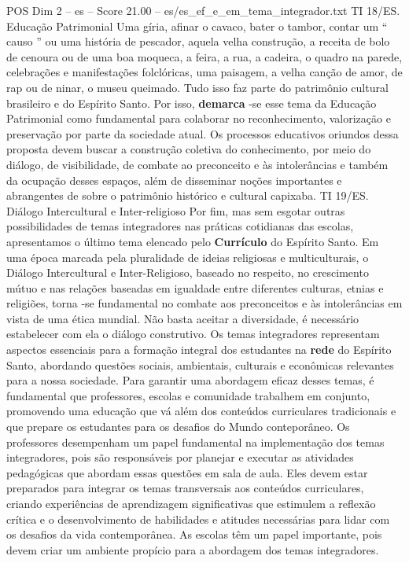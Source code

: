 \begin{textsample}{POS Dim 2 – es – Score 21.00 – es/es\_ef\_e\_em\_tema\_integrador.txt}
TI 18/ES.
Educação Patrimonial Uma gíria, afinar o cavaco, bater o tambor, contar um “ causo ” ou uma história de pescador, aquela velha construção, a receita de bolo de cenoura ou de uma boa moqueca, a feira, a rua, a cadeira, o quadro na parede, celebrações e manifestações folclóricas, uma paisagem, a velha canção de amor, de rap ou de ninar, o museu queimado.
Tudo isso faz parte do patrimônio cultural brasileiro e do Espírito Santo.
Por isso, \textbf{demarca} -se esse tema da Educação Patrimonial como fundamental para colaborar no reconhecimento, valorização e preservação por parte da sociedade atual.
Os processos educativos oriundos dessa proposta devem buscar a construção coletiva do conhecimento, por meio do diálogo, de visibilidade, de combate ao preconceito e às intolerâncias e também da ocupação desses espaços, além de disseminar noções importantes e abrangentes de sobre o patrimônio histórico e cultural capixaba.
TI 19/ES.
Diálogo Intercultural e Inter-religioso Por fim, mas sem esgotar outras possibilidades de temas integradores nas práticas cotidianas das escolas, apresentamos o último tema elencado pelo \textbf{Currículo} do Espírito Santo.
Em uma época marcada pela pluralidade de ideias religiosas e multiculturais, o Diálogo Intercultural e Inter-Religioso, baseado no respeito, no crescimento mútuo e nas relações baseadas em igualdade entre diferentes culturas, etnias e religiões, torna -se fundamental no combate aos preconceitos e às intolerâncias em vista de uma ética mundial.
Não basta aceitar a diversidade, é necessário estabelecer com ela o diálogo construtivo.
Os temas integradores representam aspectos essenciais para a formação integral dos estudantes na \textbf{rede} do Espírito Santo, abordando questões sociais, ambientais, culturais e econômicas relevantes para a nossa sociedade.
Para garantir uma abordagem eficaz desses temas, é fundamental que professores, escolas e comunidade trabalhem em conjunto, promovendo uma educação que vá além dos conteúdos curriculares tradicionais e que prepare os estudantes para os desafios do Mundo conteporâneo.
Os professores desempenham um papel fundamental na implementação dos temas integradores, pois são responsáveis por planejar e executar as atividades pedagógicas que abordam essas questões em sala de aula.
Eles devem estar preparados para integrar os temas transversais aos conteúdos curriculares, criando experiências de aprendizagem significativas que estimulem a reflexão crítica e o desenvolvimento de habilidades e atitudes necessárias para lidar com os desafios da vida contemporânea.
As escolas têm um papel importante, pois devem criar um ambiente propício para a abordagem dos temas integradores.

\end{textsample}
